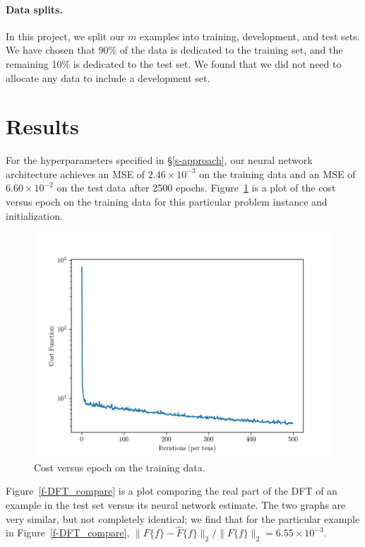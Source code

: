 \documentclass[12pt]{article}
\begin{document}
\paragraph{Data splits.} In this project, we split our $m$ examples into training, development, and test
sets. We have chosen that 90\% of the data is dedicated to the training set, and the remaining 10\% is 
dedicated to the test set. We found that we did not need to allocate any data to include a development set.

\section{Results} For the hyperparameters specified in \S\ref{s-approach}, our neural network architecture achieves 
an MSE of $2.46 \times 10^{-3}$ on the training data and an MSE of $6.60 \times 10^{-2}$ on the test data after 2500 
epochs. Figure~\ref{f-example_cost_vs_epoch} is a plot of the cost versus epoch on the training data for this particular 
problem instance and initialization.

\begin{figure}
\centering
\includegraphics[scale=.75]{figures/final_cost_vs_epoch.png}
\caption{Cost versus epoch on the training data.}
\label{f-example_cost_vs_epoch}
\end{figure}

Figure~\ref{f-DFT_compare} is a plot comparing the real part of the DFT of an example in the test set 
versus its neural network estimate. The two graphs are very similar, but not completely identical; we 
find that for the particular example in Figure~\ref{f-DFT_compare}, 
$\|F\{f\} - \hat{F}\{f\}\|_2 / \|F\{f\}\|_2 = 6.55 \times 10^{-3}.$
\end{document}
